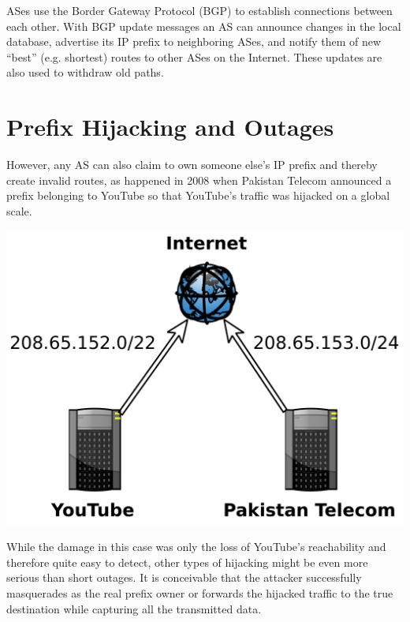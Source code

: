 \documentclass[a0,portrait,posterdraft]{a0poster}
\begin{document}
\begin{mybox}
\begin{multicols}{3}
\noindent ASes use the Border Gateway Protocol (BGP) to establish connections
between each other. With BGP update messages an AS can announce changes in the
local database, advertise its IP prefix to neighboring ASes, and notify them of
new ``best'' (e.g. shortest) routes to other ASes on the Internet. These updates
are also used to withdraw old paths.

\section*{Prefix Hijacking and Outages}
However, any AS can also claim to own someone else's IP prefix and thereby
create invalid routes, as happened in 2008 when Pakistan Telecom announced a
prefix belonging to YouTube so that YouTube's traffic was hijacked on a global
scale.

\vfill
\columnbreak

\begin{center}\vspace{1cm}
\includegraphics[width=0.9\linewidth,interpolate]{youtube_hijack.pdf}
\end{center}\vspace{1cm}

\noindent While the damage in this case was only the loss of YouTube's
reachability and therefore quite easy to detect, other types of hijacking might
be even more serious than short outages. It is conceivable that the attacker
successfully masquerades as the real prefix owner or forwards the hijacked
traffic to the true destination while capturing all the transmitted data.


\end{multicols}
\end{mybox}
\end{document}
